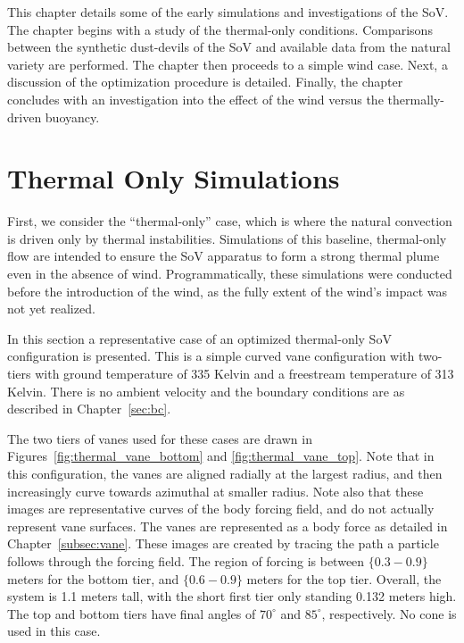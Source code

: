 \label{sec:results}

%
%
%
%

This chapter details some of the early simulations and investigations
of the SoV. The chapter begins with a study of the thermal-only
conditions. Comparisons between the synthetic dust-devils of the SoV and
available data from the natural variety are performed. The chapter then
proceeds to a simple wind case. Next, a discussion of the optimization
procedure is detailed. Finally, the chapter concludes with an
investigation into the effect of the wind versus the thermally-driven buoyancy. 


\section{Thermal Only Simulations}
\label{sec:thermal_only}


First, we consider the ``thermal-only'' case, which is 
where the natural convection is driven only by thermal instabilities. 
Simulations of this
baseline, thermal-only flow are intended to ensure the SoV apparatus to
form a strong thermal plume even in the absence of
wind. Programmatically, these simulations were conducted before the
introduction of the wind, as the fully extent of the wind's impact was
not yet realized. 

In this section a representative case of an optimized thermal-only SoV
configuration is presented. This is a simple curved vane configuration with
two-tiers with ground temperature of 335 Kelvin and a freestream
temperature of 313 Kelvin. There is no ambient velocity and the boundary
conditions are as described in Chapter~\ref{sec:bc}.  

The two tiers of vanes used for these cases are drawn in
Figures~\ref{fig:thermal_vane_bottom} and \ref{fig:thermal_vane_top}.  
Note that in this configuration, the vanes are aligned radially at the
largest radius, and then increasingly curve towards azimuthal at smaller
radius. Note also that these images are representative curves of the
body forcing field, and do not actually represent vane surfaces. The
vanes are represented as a body force as detailed in
Chapter~\ref{subsec:vane}. These images are created by tracing the path
a particle follows through the forcing field. The 
region of forcing is between $\{0.3-0.9\}$ meters for the bottom tier,
and $\{0.6-0.9\}$ meters for the top tier. Overall, the system is 1.1
meters tall, with the short first tier only standing 0.132 meters
high. The top and bottom tiers have final angles of $70^{\circ}$ and
$85^{\circ}$, respectively. No cone is used in this case. 

